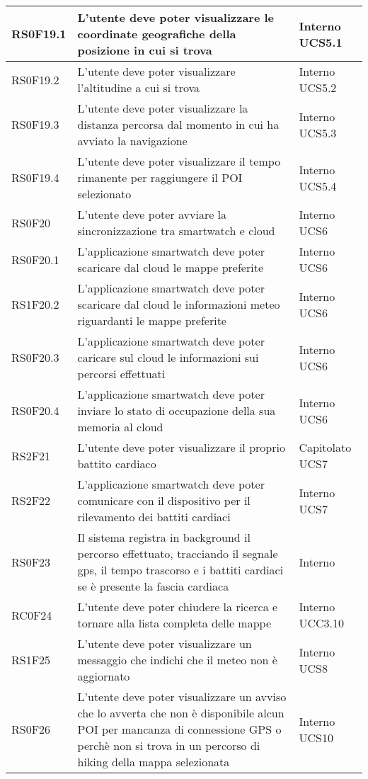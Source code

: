 \begin{center}
\begin{longtable}{|l|p{7cm}|p{1.7cm}|}
RS0F19.1	& L'utente deve poter visualizzare le coordinate geografiche della posizione in cui si trova & Interno UCS5.1 \\\hline
RS0F19.2	& L'utente deve poter visualizzare l'altitudine a cui si trova & Interno UCS5.2 \\\hline
RS0F19.3	& L'utente deve poter visualizzare la distanza percorsa dal momento in cui ha avviato la navigazione & Interno UCS5.3 \\\hline
RS0F19.4	& L'utente deve poter visualizzare il tempo rimanente per raggiungere il POI selezionato & Interno UCS5.4 \\\hline
RS0F20		& L'utente deve poter avviare la sincronizzazione tra smartwatch e cloud & Interno UCS6 \\\hline
RS0F20.1	& L'applicazione smartwatch deve poter scaricare dal cloud le mappe preferite & Interno UCS6 \\\hline
RS1F20.2	& L'applicazione smartwatch deve poter scaricare dal cloud le informazioni meteo riguardanti le mappe preferite & Interno UCS6 \\\hline
RS0F20.3	& L'applicazione smartwatch deve poter caricare sul cloud le informazioni sui percorsi effettuati & Interno UCS6 \\\hline
RS0F20.4		& L'applicazione smartwatch deve poter inviare lo stato di occupazione della sua memoria al cloud & Interno UCS6 \\\hline
RS2F21		& L'utente deve poter visualizzare il proprio battito cardiaco & Capitolato UCS7 \\\hline
RS2F22		& L'applicazione smartwatch deve poter comunicare con il dispositivo per il rilevamento dei battiti cardiaci & Interno UCS7 \\\hline
RS0F23		& Il sistema registra in background il percorso effettuato, tracciando il segnale gps, il tempo trascorso e i battiti cardiaci se è presente la fascia cardiaca & Interno \\\hline
RC0F24		& L'utente deve poter chiudere la ricerca e tornare alla lista completa delle mappe & Interno UCC3.10 \\\hline
RS1F25	& L'utente deve poter visualizzare un messaggio che indichi che il meteo non è aggiornato & Interno UCS8 \\\hline
RS0F26	& L'utente deve poter visualizzare un avviso che lo avverta che non è disponibile alcun POI per mancanza di connessione GPS o perchè non si trova in un percorso di hiking della mappa selezionata  & Interno UCS10 \\\hline

\end{longtable}
\end{center}
